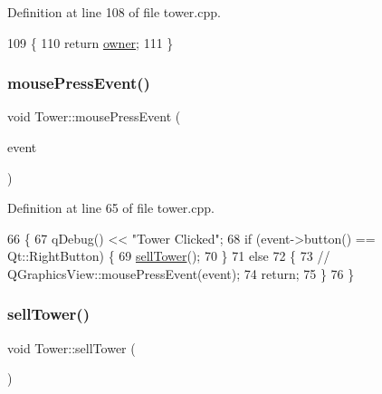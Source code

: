Definition at line 108 of file tower.\+cpp.


\begin{DoxyCode}
109 \{
110     \textcolor{keywordflow}{return} \hyperlink{class_tower_abff7e8aaf637c17bcba08f9097db38df}{owner};
111 \}
\end{DoxyCode}
\mbox{\label{class_tower_a11d4b8069b148e8587b2e7bc2d68b55d}} 
\subsubsection{\texorpdfstring{mouse\+Press\+Event()}{mousePressEvent()}}
{\footnotesize\ttfamily void Tower\+::mouse\+Press\+Event (\begin{DoxyParamCaption}\item[{Q\+Mouse\+Event $\ast$}]{event }\end{DoxyParamCaption})\hspace{0.3cm}{\ttfamily [virtual]}}



Definition at line 65 of file tower.\+cpp.


\begin{DoxyCode}
66 \{
67     qDebug() << \textcolor{stringliteral}{"Tower Clicked"};
68     \textcolor{keywordflow}{if} (event->button() == Qt::RightButton) \{
69         \hyperlink{class_tower_a7736b1132e64e14a977e9e8c91c3338f}{sellTower}();
70     \}
71     \textcolor{keywordflow}{else}
72     \{
73 \textcolor{comment}{//        QGraphicsView::mousePressEvent(event);}
74         \textcolor{keywordflow}{return};
75     \}
76 \}
\end{DoxyCode}
\mbox{\label{class_tower_a7736b1132e64e14a977e9e8c91c3338f}} 
\subsubsection{\texorpdfstring{sell\+Tower()}{sellTower()}}
{\footnotesize\ttfamily void Tower\+::sell\+Tower (\begin{DoxyParamCaption}{ }\end{DoxyParamCaption})\hspace{0.3cm}{\ttfamily [virtual]}}



